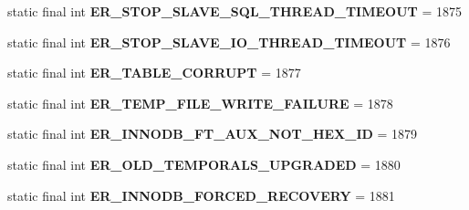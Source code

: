 \begin{DoxyCompactItemize}
\item 
\mbox{\label{classcom_1_1mysql_1_1jdbc_1_1_mysql_error_numbers_a4d9be3d61d87a9eca37fc2f8216ecdf7}} 
static final int {\bfseries E\+R\+\_\+\+S\+T\+O\+P\+\_\+\+S\+L\+A\+V\+E\+\_\+\+S\+Q\+L\+\_\+\+T\+H\+R\+E\+A\+D\+\_\+\+T\+I\+M\+E\+O\+UT} = 1875
\item 
\mbox{\label{classcom_1_1mysql_1_1jdbc_1_1_mysql_error_numbers_ace2ccc64426ce682a3b1e9cfa1a27a3a}} 
static final int {\bfseries E\+R\+\_\+\+S\+T\+O\+P\+\_\+\+S\+L\+A\+V\+E\+\_\+\+I\+O\+\_\+\+T\+H\+R\+E\+A\+D\+\_\+\+T\+I\+M\+E\+O\+UT} = 1876
\item 
\mbox{\label{classcom_1_1mysql_1_1jdbc_1_1_mysql_error_numbers_a03e07fd6f14d59ab8c5459dad9ba774f}} 
static final int {\bfseries E\+R\+\_\+\+T\+A\+B\+L\+E\+\_\+\+C\+O\+R\+R\+U\+PT} = 1877
\item 
\mbox{\label{classcom_1_1mysql_1_1jdbc_1_1_mysql_error_numbers_a2e05f4d3827f7cafbd7024a94308f6b6}} 
static final int {\bfseries E\+R\+\_\+\+T\+E\+M\+P\+\_\+\+F\+I\+L\+E\+\_\+\+W\+R\+I\+T\+E\+\_\+\+F\+A\+I\+L\+U\+RE} = 1878
\item 
\mbox{\label{classcom_1_1mysql_1_1jdbc_1_1_mysql_error_numbers_a50a0903af6b263190b78904453ab5671}} 
static final int {\bfseries E\+R\+\_\+\+I\+N\+N\+O\+D\+B\+\_\+\+F\+T\+\_\+\+A\+U\+X\+\_\+\+N\+O\+T\+\_\+\+H\+E\+X\+\_\+\+ID} = 1879
\item 
\mbox{\label{classcom_1_1mysql_1_1jdbc_1_1_mysql_error_numbers_a0dd3cfcd0684d9ef8fe3af7341256080}} 
static final int {\bfseries E\+R\+\_\+\+O\+L\+D\+\_\+\+T\+E\+M\+P\+O\+R\+A\+L\+S\+\_\+\+U\+P\+G\+R\+A\+D\+ED} = 1880
\item 
\mbox{\label{classcom_1_1mysql_1_1jdbc_1_1_mysql_error_numbers_a97f6f541f79487aef2972651ad10afc6}} 
static final int {\bfseries E\+R\+\_\+\+I\+N\+N\+O\+D\+B\+\_\+\+F\+O\+R\+C\+E\+D\+\_\+\+R\+E\+C\+O\+V\+E\+RY} = 1881
\item 

\end{DoxyCompactItemize}
